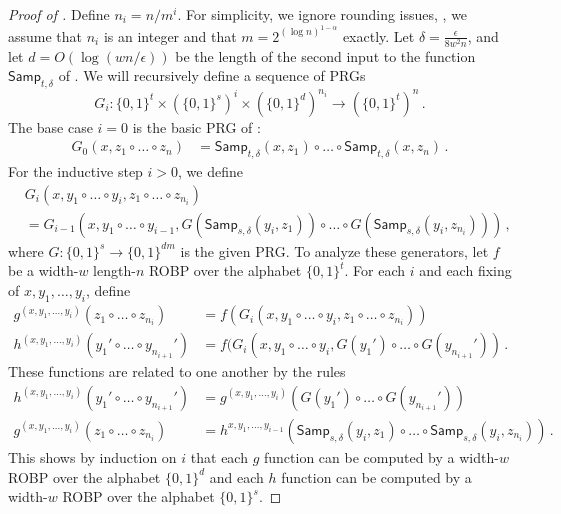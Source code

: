 \documentclass{toc}
\begin{document}
\begin{proof}[Proof of ]
Define $n_i = n / m^i$. For simplicity, we ignore rounding issues, \ie, we assume that $n_i$ is an integer and that $m = 2^{(\log n)^{1 - \alpha}}$ exactly. Let $\delta = \frac{\epsilon}{8w^2 n}$, and let $d = O(\log(wn/\epsilon))$ be the length of the second input to the function $\mathsf{Samp}_{t, \delta}$ of . We will recursively define a sequence of PRGs
$$
G_i \colon \{0, 1\}^t \times (\{0, 1\}^s)^i \times (\{0, 1\}^d)^{n_i} \to (\{0, 1\}^t)^n\,.
$$
The base case $i = 0$ is the basic PRG of :
\begin{align*}
G_0(x, z_1 \circ \dots \circ z_n) &= \mathsf{Samp}_{t, \delta}(x, z_1) \circ \dots \circ \mathsf{Samp}_{t, \delta}(x, z_n)\,.
\end{align*}
For the inductive step $i > 0$, we define
\begin{align*}
&G_i(x, y_1 \circ \dots \circ y_i, z_1 \circ \dots \circ z_{n_i})\\
&{}= G_{i - 1}(x, y_1 \circ \dots \circ y_{i - 1}, G(\mathsf{Samp}_{s, \delta}(y_i, z_1)) \circ \dots \circ G(\mathsf{Samp}_{s, \delta}(y_i, z_{n_i})))\,,
\end{align*}
where $G \colon \{0, 1\}^s \to \{0, 1\}^{dm}$ is the given PRG. To analyze these generators, let $f$ be a width-$w$ length-$n$ ROBP over the alphabet $\{0, 1\}^t$. For each $i$ and each fixing of $x, y_1, \dots, y_i$, define
\begin{align*}
g^{(x, y_1, \dots, y_i)}(z_1 \circ \dots \circ z_{n_i}) &= f(G_i(x, y_1 \circ \dots \circ y_i, z_1 \circ \dots \circ z_{n_i})) \\
h^{(x, y_1, \dots, y_i)}(y_1' \circ \dots \circ y_{n_{i + 1}}') &= f(G_i(x, y_1 \circ \dots \circ y_i, G(y_1') \circ \dots \circ G(y_{n_{i + 1}}'))\,.
\end{align*}
These functions are related to one another by the rules
\begin{align}
h^{(x, y_1, \dots, y_i)}(y_1' \circ \dots \circ y_{n_{i + 1}}') &= g^{(x, y_1, \dots, y_i)}(G(y_1') \circ \dots \circ G(y_{n_{i + 1}}')) \label{eqn:h-from-g} \\
g^{(x, y_1, \dots, y_i)}(z_1 \circ \dots \circ z_{n_i}) &= h^{x, y_1, \dots, y_{i - 1}}(\mathsf{Samp}_{s, \delta}(y_i, z_1) \circ \dots \circ \mathsf{Samp}_{s, \delta}(y_i, z_{n_i}))\,. \label{eqn:g-from-h}
\end{align}
This shows by induction on $i$ that each $g$ function can be computed by a width-$w$ ROBP over the alphabet $\{0, 1\}^d$ and each $h$ function can be computed by a width-$w$ ROBP over the alphabet $\{0, 1\}^s$.


\end{proof}
\end{document}
